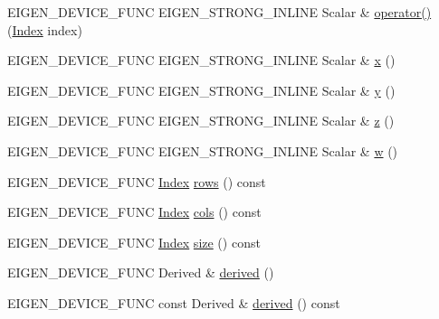 \begin{DoxyCompactItemize}
\item 
E\+I\+G\+E\+N\+\_\+\+D\+E\+V\+I\+C\+E\+\_\+\+F\+U\+NC E\+I\+G\+E\+N\+\_\+\+S\+T\+R\+O\+N\+G\+\_\+\+I\+N\+L\+I\+NE Scalar \& \mbox{\hyperlink{class_eigen_1_1_dense_coeffs_base_3_01_derived_00_01_write_accessors_01_4_a49d29adf378f99cd8ab048bff8a3f881}{operator()}} (\mbox{\hyperlink{struct_eigen_1_1_eigen_base_a554f30542cc2316add4b1ea0a492ff02}{Index}} index)
\item 
E\+I\+G\+E\+N\+\_\+\+D\+E\+V\+I\+C\+E\+\_\+\+F\+U\+NC E\+I\+G\+E\+N\+\_\+\+S\+T\+R\+O\+N\+G\+\_\+\+I\+N\+L\+I\+NE Scalar \& \mbox{\hyperlink{class_eigen_1_1_dense_coeffs_base_3_01_derived_00_01_write_accessors_01_4_a2a9ca10b9ee750cefc5f914f215cba18}{x}} ()
\item 
E\+I\+G\+E\+N\+\_\+\+D\+E\+V\+I\+C\+E\+\_\+\+F\+U\+NC E\+I\+G\+E\+N\+\_\+\+S\+T\+R\+O\+N\+G\+\_\+\+I\+N\+L\+I\+NE Scalar \& \mbox{\hyperlink{class_eigen_1_1_dense_coeffs_base_3_01_derived_00_01_write_accessors_01_4_ac04b8e2ab263c3901d72c5240ad017b5}{y}} ()
\item 
E\+I\+G\+E\+N\+\_\+\+D\+E\+V\+I\+C\+E\+\_\+\+F\+U\+NC E\+I\+G\+E\+N\+\_\+\+S\+T\+R\+O\+N\+G\+\_\+\+I\+N\+L\+I\+NE Scalar \& \mbox{\hyperlink{class_eigen_1_1_dense_coeffs_base_3_01_derived_00_01_write_accessors_01_4_ad64b8fa3ee1cda9eb3df918eaf8b0396}{z}} ()
\item 
E\+I\+G\+E\+N\+\_\+\+D\+E\+V\+I\+C\+E\+\_\+\+F\+U\+NC E\+I\+G\+E\+N\+\_\+\+S\+T\+R\+O\+N\+G\+\_\+\+I\+N\+L\+I\+NE Scalar \& \mbox{\hyperlink{class_eigen_1_1_dense_coeffs_base_3_01_derived_00_01_write_accessors_01_4_a225a129a5f2d8863068bd5629a6144a6}{w}} ()
\item 
E\+I\+G\+E\+N\+\_\+\+D\+E\+V\+I\+C\+E\+\_\+\+F\+U\+NC \mbox{\hyperlink{struct_eigen_1_1_eigen_base_a554f30542cc2316add4b1ea0a492ff02}{Index}} \mbox{\hyperlink{class_eigen_1_1_dense_coeffs_base_3_01_derived_00_01_write_accessors_01_4_a8141320ba8df384426c298b32b000d8e}{rows}} () const
\item 
E\+I\+G\+E\+N\+\_\+\+D\+E\+V\+I\+C\+E\+\_\+\+F\+U\+NC \mbox{\hyperlink{struct_eigen_1_1_eigen_base_a554f30542cc2316add4b1ea0a492ff02}{Index}} \mbox{\hyperlink{class_eigen_1_1_dense_coeffs_base_3_01_derived_00_01_write_accessors_01_4_a7b0b45c7351847696c911ce8aa2abbdb}{cols}} () const
\item 
E\+I\+G\+E\+N\+\_\+\+D\+E\+V\+I\+C\+E\+\_\+\+F\+U\+NC \mbox{\hyperlink{struct_eigen_1_1_eigen_base_a554f30542cc2316add4b1ea0a492ff02}{Index}} \mbox{\hyperlink{class_eigen_1_1_dense_coeffs_base_3_01_derived_00_01_write_accessors_01_4_ac2c9348df3bb9c0044dbae6c278a8977}{size}} () const
\item 
E\+I\+G\+E\+N\+\_\+\+D\+E\+V\+I\+C\+E\+\_\+\+F\+U\+NC Derived \& \mbox{\hyperlink{class_eigen_1_1_dense_coeffs_base_3_01_derived_00_01_write_accessors_01_4_a324b16961a11d2ecfd2d1b7dd7946545}{derived}} ()
\item 
E\+I\+G\+E\+N\+\_\+\+D\+E\+V\+I\+C\+E\+\_\+\+F\+U\+NC const Derived \& \mbox{\hyperlink{class_eigen_1_1_dense_coeffs_base_3_01_derived_00_01_write_accessors_01_4_ad0cbee5e2dfef3bbe9db5e6d5fe12cc0}{derived}} () const
\end{DoxyCompactItemize}
